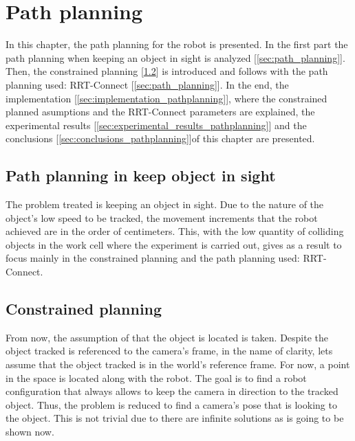 \chapter{Path planning} %
\label{chap:path_planning}

In this chapter, the path planning for the robot is presented.
In the first part the path planning when keeping an object in sight is analyzed [\ref{sec:path_planning}]. Then, the constrained planning [\ref{sec:constrained_planning}] is introduced and follows with the path planning used: RRT-Connect [\ref{sec:path_planning}]. In the end, the implementation [\ref{sec:implementation_pathplanning}], where the constrained planned asumptions and the RRT-Connect parameters are explained, the experimental results [\ref{sec:experimental_results_pathplanning}] and the conclusions [\ref{sec:conclusions_pathplanning}]of this chapter are presented.

\section{Path planning in keep object in sight} %
\label{sec:path_planning_in_keep_object_in_sight}
The problem treated is keeping an object in sight. 
Due to the nature of the object's low speed to be tracked, the movement increments that the robot achieved are in the order of centimeters. 
This, with the low quantity of colliding objects in the work cell where the experiment is carried out, gives as a result to focus mainly in the constrained planning and the path planning used: RRT-Connect.

\section{Constrained planning} %
\label{sec:constrained_planning}
From now, the assumption of that the object is located is taken. 
Despite the object tracked is referenced to the camera's frame, in the name of clarity, lets assume that the object tracked is in the world's reference frame. 
For now, a point in the space is located along with the robot.
The goal is to find a robot configuration that always allows to keep the camera in direction to the tracked object.
Thus, the problem is reduced to find a camera's pose that is looking to the object.
This is not trivial due to there are infinite solutions as is going to be shown now. \\


